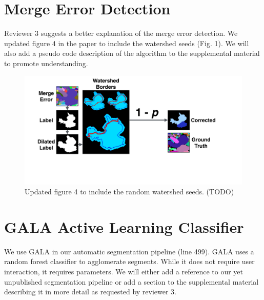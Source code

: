 \documentclass[10pt,twocolumn,letterpaper]{article}
\begin{document}
\section{Merge Error Detection}

Reviewer 3 suggests a better explanation of the merge error detection. We updated figure 4 in the paper to include the watershed seeds (Fig. 1). We will also add a pseudo code description of the algorithm to the supplemental material to promote understanding.

\begin{figure}[h]
\centering
\includegraphics[width=\linewidth]{gfx/merge_error_v4.pdf}
\caption{Updated figure 4 to include the random watershed seeds. (TODO)}
\label{fig:merge_error}
\end{figure}


\section{GALA Active Learning Classifier}

We use GALA in our automatic segmentation pipeline (line 499). GALA uses a random forest classifier to agglomerate segments. While it does not require user interaction, it requires parameters. We will either add a reference to our yet unpublished segmentation pipeline or add a section to the supplemental material describing it in more detail as requested by reviewer 3.

%
%
\end{document}
